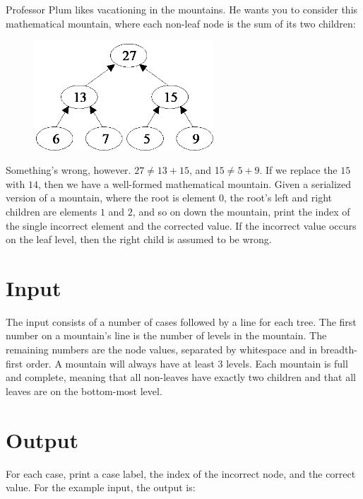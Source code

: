 
Professor Plum likes vacationing in the mountains.  He wants you to consider this mathematical mountain, where each non-leaf node is the sum of its two children:

\begin{figure}[h]
\begin{center}
\includegraphics[width=0.6\textwidth]{problem6tree.png} 
\end{center}
\end{figure}

Something’s wrong, however. $27 \neq 13 + 15$, and 1$5 \neq 5 + 9$. If we replace the $15$ with $14$, then we have a well-formed mathematical mountain. Given a serialized version of a mountain, where the root is element $0$, the root’s left and right children are elements $1$ and $2$, and so on down the mountain, print the index of the single incorrect element and the corrected value.  If the incorrect value occurs on the leaf level, then the right child is assumed to be wrong.

\section*{Input}
The input consists of a number of cases followed by a line for each tree. The first number on a mountain’s line is the number of levels in the mountain. The remaining numbers are the node values, separated by whitespace and in breadth-first order. A mountain will always have at least $3$ levels. Each mountain is full and complete, meaning that all non-leaves have exactly two children and that all leaves are on the bottom-most level.

\section*{Output}
For each case, print a case label, the index of the incorrect node, and the correct value. For the example input, the output is: